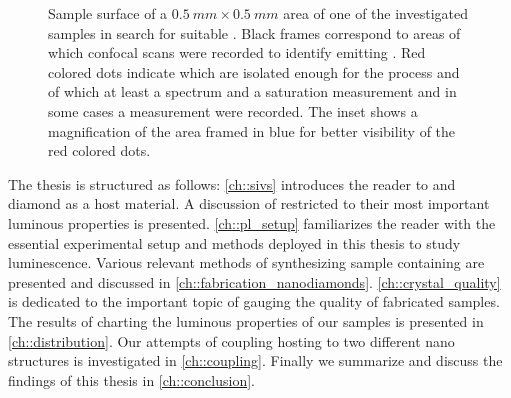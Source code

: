    	\begin{figure}[htbp]
   		\centering
   		\caption[LSM scan, overview of a $\SI{0.5}{mm}\times\SI{0.5}{mm}$ area]{Sample surface of a $\SI{0.5}{mm}\times\SI{0.5}{mm}$ area of one of the investigated samples in search for suitable \nds. Black frames correspond to areas of which confocal scans were recorded to identify \nds emitting \fl. Red colored dots indicate \nds which are isolated enough for the \pp process and of which at least a \pl spectrum and a saturation measurement and in some cases a \gt measurement were recorded. The inset shows a magnification of the area framed in blue for better visibility of the red colored dots.}
   		\label{fig::milky_way1}
   	\end{figure}


	The thesis is structured as follows: \cref{ch::sivs} introduces the reader to \ccs and diamond as a host material. A discussion of \sivs restricted to their most important luminous properties is presented. \cref{ch::pl_setup} familiarizes the reader with the essential experimental setup and methods deployed in this thesis to study \siv luminescence. Various relevant methods of synthesizing sample \nds containing \sivs are presented and discussed in \cref{ch::fabrication_nanodiamonds}. \cref{ch::crystal_quality} is dedicated to the important topic of gauging the quality of fabricated samples. The results of charting the luminous properties of our \nds samples is presented in \cref{ch::distribution}. Our attempts of coupling \nds hosting \sivs to two different nano structures is investigated in \cref{ch::coupling}. Finally we summarize and discuss the findings of this thesis in \cref{ch::conclusion}.
